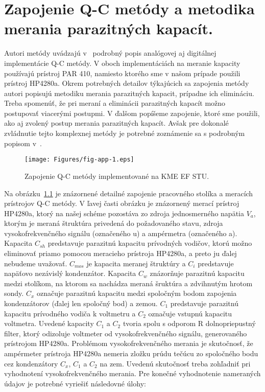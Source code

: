 
\chapter{Zapojenie Q-C metódy a metodika merania parazitných kapacít.}\label{app:AppendixE}

Autori metódy uvádzajú v~\cite{App.2, App.3, App.4} podrobný popis
analógovej aj digitálnej implementácie Q-C metódy.  V oboch
implementáciách na meranie kapacity používajú prístroj PAR 410,
namiesto ktorého sme v našom prípade použili prístroj HP4280a. Okrem
potrebných detailov týkajúcich sa zapojenia metódy autori popisujú
metodiku merania parazitných kapacit, prípadne ich elimináciu. Treba
spomenúť, že pri meraní a eliminácii parazitných kapacít možno
postupovať viacerými postupmi. V ďalšom popíšeme zapojenie, ktoré sme
použili, ako aj zvolený postup merania parazitných kapacít. Avšak pre
dokonalé zvládnutie tejto komplexnej metódy je potrebné zoznámenie sa
s podrobným popisom v~\cite{App.2, App.3, App.4}.

\begin{figure}[h!]\centering
  \texttt{[image: Figures/fig-app-1.eps]}
  \caption[Zapojenie Q-C metódy implementované na KME EF
    STU.]{Zapojenie Q-C metódy implementované na KME EF
    STU.}\label{fig:App.1}
\end{figure}

\par Na obrázku~\ref{fig:App.1} je znázornené detailné zapojenie
pracovného stolíka a meracích prístrojov Q-C metódy. V ľavej časti
obrázku je znázornený merací prístroj HP4280a, ktorý na našej schéme
pozostáva zo zdroja jednosmerného napätia $V_a$, ktorým je meraná
štruktúra privedená do požadovaného stavu, zdroja vysokofrekvenčného
signálu (označeného u) a ampérmetra (označeného a).  Kapacita $C_{sh}$
predstavuje parazitnú kapacitu prívodných vodičov, ktorú možno
eliminovať priamo pomocou meracieho prístroja HP4280a, a preto ju
ďalej nebudeme uvažovať. $C_{mos}$ je kapacita meranej štruktúry a
$C_i$ predstavuje napäťovo nezávislý kondenzátor. Kapacita $C_w$
znázorňuje parazitnú kapacitu medzi stolíkom, na ktorom sa nachádza
meraná šruktúra a zdvihnutým hrotom sondy. $C_x$ označuje parazitnú
kapacitu medzi spoločným bodom zapojenia kondenzátorov (ďalej len
spoločný bod) a zemou.  $C_1$ predstavuje parazitnú kapacitu
prívodného vodiča k voltmetru a $C_2$ označuje vstupnú kapacitu
voltmetra.  Uvedené kapacity $C_1$ a $C_2$ tvoria spolu s odporom R
dolnopriepustný filter, ktorý odizoluje voltmeter od
vysokofrekvenčného signálu, generovaného prístrojom HP4280a. Problémom
vysokofrekvenčného merania je skutočnosť, že ampérmeter prístroja
HP4280a nemeria zložku prúdu tečúcu zo spoločného bodu cez
kondenzátory $C_x$, $C_1$ a $C_2$ na zem. Uvedenú skutočnosť treba
zohľadniť pri vyhodnotení vysokofrekvenčného merania. Pre konečné
vyhodnotenie nameraných údajov je potrebné vyriešiť následovné úlohy:

